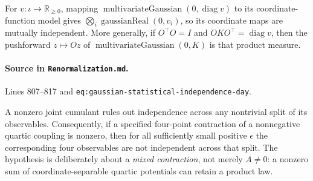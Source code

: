 \begin{theorem}
\label{thm:renorm:diagonalGaussianIndependence}
For $v:\iota\to\mathbb R_{\geq0}$, mapping
$\operatorname{multivariateGaussian}(0,\operatorname{diag}v)$ to its coordinate-function model
gives $\bigotimes_i\operatorname{gaussianReal}(0,v_i)$, so its coordinate maps are mutually
independent.  More generally, if $O^\top O=I$ and
$OKO^\top=\operatorname{diag}v$, then the pushforward $z\mapsto Oz$ of
$\operatorname{multivariateGaussian}(0,K)$ is that product measure.

\paragraph{Source in \texttt{Renormalization.md}.}
Lines 807--817 and \texttt{eq:gaussian-statistical-independence-day}.
\end{theorem}

\begin{theorem}
\label{thm:renorm:quarticNonfactorization}
A nonzero joint cumulant rules out independence across any nontrivial split of its observables.
Consequently, if a specified four-point contraction of a nonnegative quartic coupling is nonzero,
then for all sufficiently small positive $\epsilon$ the corresponding four observables are not
independent across that split.  The hypothesis is deliberately about a \emph{mixed contraction},
not merely $A\neq0$: a nonzero sum of coordinate-separable quartic potentials can retain a product
law.
\end{theorem}

